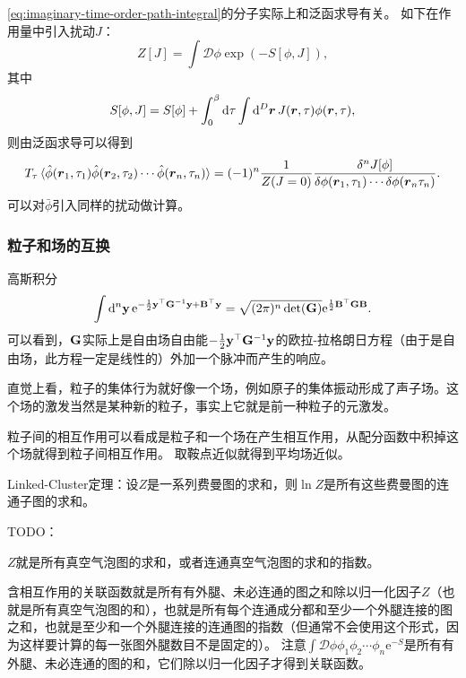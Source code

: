\documentclass[hyperref, UTF8, a4paper]{ctexart}
\newcommand*{\ee}{\mathrm{e}}
\newcommand*{\fd}[1]{\mathcal{D}{#1}}
\begin{document}
\eqref{eq:imaginary-time-order-path-integral}的分子实际上和泛函求导有关。
如下在作用量中引入扰动$J$：
\begin{equation}
    Z[J] = \int \fd{\phi} \exp ( - S[\phi, J] ),
\end{equation}
其中
\begin{equation}
    S[\phi, J] = S[\phi] + \int_0^\beta \dd{\tau} \int \dd[D]{\vb*{r}} J(\vb*{r}, \tau) \phi(\vb*{r}, \tau),
\end{equation}
则由泛函求导可以得到
\begin{equation}
    T_\tau \expval*{\hat{\phi}(\vb*{r}_1, \tau_1) \hat{\phi}(\vb*{r}_2, \tau_2) \cdots \hat{\phi}(\vb*{r}_n, \tau_n)} = (-1)^n \frac{1}{Z(J=0)} \frac{\var^n J[\phi]}{\var{\phi(\vb*{r}_1, \tau_1)} \cdots \var{\phi(\vb*{r}_n \tau_n)}}.
\end{equation}
可以对$\bar{\phi}$引入同样的扰动做计算。

\subsubsection{粒子和场的互换}

高斯积分
\begin{equation}
    \int \dd[n]{\vb{y}} \ee^{-\frac{1}{2} \vb{y}^\top \vb{G}^{-1} \vb{y} + \vb{B}^\top \vb{y}} = \sqrt{(2\pi)^n \det(\vb{G})} \ee^{\frac{1}{2} \vb{B}^\top \vb{G} \vb{B}}.
\end{equation}
可以看到，$\vb{G}$实际上是自由场自由能$-\frac{1}{2} \vb{y}^\top \vb{G}^{-1} \vb{y}$的欧拉-拉格朗日方程（由于是自由场，此方程一定是线性的）外加一个脉冲而产生的响应。

直觉上看，粒子的集体行为就好像一个场，例如原子的集体振动形成了声子场。这个场的激发当然是某种新的粒子，事实上它就是前一种粒子的元激发。

粒子间的相互作用可以看成是粒子和一个场在产生相互作用，从配分函数中积掉这个场就得到粒子间相互作用。
取鞍点近似就得到平均场近似。

Linked-Cluster定理：设$Z$是一系列费曼图的求和，则$\ln Z$是所有这些费曼图的连通子图的求和。

TODO：

$Z$就是所有真空气泡图的求和，或者连通真空气泡图的求和的指数。

含相互作用的关联函数就是所有有外腿、未必连通的图之和除以归一化因子$Z$（也就是所有真空气泡图的和），也就是所有每个连通成分都和至少一个外腿连接的图之和，也就是至少和一个外腿连接的连通图的指数（但通常不会使用这个形式，因为这样要计算的每一张图外腿数目不是固定的）。
注意$\int \fd{\phi} \phi_1 \phi_2 \cdots \phi_n \ee^{-S}$是所有有外腿、未必连通的图的和，它们除以归一化因子才得到关联函数。
\end{document}
